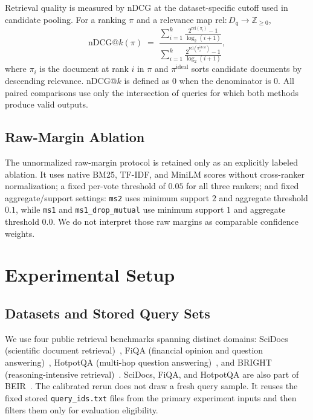 \documentclass[manuscript,anonymous,review]{acmart}
\begin{document}
Retrieval quality is measured by nDCG at the dataset-specific cutoff used in
candidate pooling. For a ranking $\pi$ and a relevance map $\mathrm{rel}:D_q
\to \mathbb{Z}_{\ge 0}$,
\begin{equation}
  \mathrm{nDCG@}k(\pi) \;=\; \frac{\displaystyle\sum_{i=1}^{k} \frac{2^{\mathrm{rel}(\pi_i)}-1}{\log_2(i+1)}}
  {\displaystyle\sum_{i=1}^{k} \frac{2^{\mathrm{rel}(\pi_i^{\mathrm{ideal}})}-1}{\log_2(i+1)}},
  \label{eq:ndcg}
\end{equation}
where $\pi_i$ is the document at rank $i$ in $\pi$ and $\pi^{\mathrm{ideal}}$
sorts candidate documents by descending relevance. nDCG@$k$ is defined as $0$
when the denominator is $0$. All paired comparisons use only the intersection
of queries for which both methods produce valid outputs.

\subsection{Raw-Margin Ablation}

The unnormalized raw-margin protocol is retained only as an explicitly labeled
ablation. It uses native BM25, TF-IDF, and MiniLM scores without cross-ranker
normalization; a fixed per-vote threshold of $0.05$ for all three rankers; and
fixed aggregate/support settings: \texttt{ms2} uses minimum support $2$ and
aggregate threshold $0.1$, while \texttt{ms1} and
\texttt{ms1\_drop\_mutual} use minimum support $1$ and aggregate threshold
$0.0$. We do not interpret those raw margins as comparable confidence weights.

\section{Experimental Setup}
\label{sec:experimental-setup}

\subsection{Datasets and Stored Query Sets}
\label{sec:datasets}

We use four public retrieval benchmarks spanning distinct domains: SciDocs
(scientific document retrieval)~\cite{cohan2020scidocs}, FiQA (financial
opinion and question answering)~\cite{maia2018fiqa}, HotpotQA (multi-hop
question answering)~\cite{yang2018hotpotqa}, and BRIGHT (reasoning-intensive
retrieval)~\cite{su2024bright}. SciDocs, FiQA, and HotpotQA are also part of
BEIR~\cite{thakur2021beir}. The calibrated rerun does not draw a fresh query
sample. It reuses the fixed stored \texttt{query\_ids.txt} files from the
primary experiment inputs and then filters them only for evaluation
eligibility.
\end{document}
